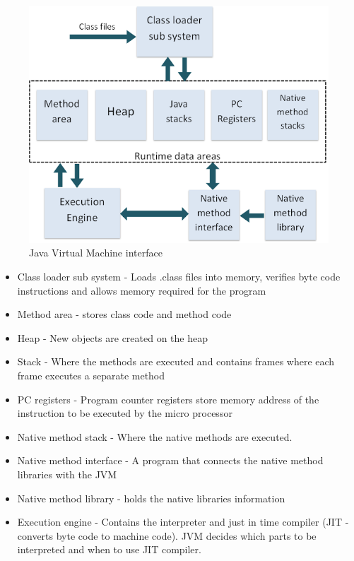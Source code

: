 \documentclass[a4paper, titlepage]{article}
\begin{document}
\begin{figure}[H]
	\centering
	\includegraphics[width=\textwidth]{images/jvm.png}
	\caption{Java Virtual Machine interface}
	\label{fig:jvm}
\end{figure}

\begin{itemize}
	\item Class loader sub system - Loads .class files into memory, verifies byte code instructions and allows memory required for the program
	\item Method area - stores class code and method code
	\item Heap - New objects are created on the heap
	\item Stack - Where the methods are executed and contains frames where each frame executes a separate method
	\item PC registers - Program counter registers store memory address of the instruction to be executed by the micro processor
	\item Native method stack - Where the native methods are executed.
	\item Native method interface - A program that connects the native method libraries with the JVM
	\item Native method library - holds the native libraries information
	\item Execution engine - Contains the interpreter and just in time compiler (JIT - converts byte code to machine code). JVM decides which parts to be interpreted and when to use JIT compiler.
\end{itemize}
\end{document}
